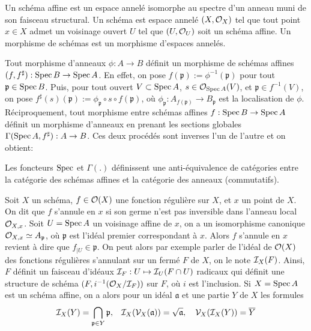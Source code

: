 \begin{defn}
Un schéma affine est un espace annelé isomorphe au spectre d'un anneau muni de son faisceau structural. Un schéma est espace annelé $(X,\mathcal{O}_X)$ tel que tout point $x\in X$ admet un voisinage ouvert $U$ tel que $(U,\mathcal{O}_U)$ soit un schéma affine. Un morphisme de schémas est un morphisme d'espaces annelés.
\end{defn}

Tout morphisme d'anneaux $\phi:A\rightarrow B$ définit un morphisme de schémas affines $(f,f^\sharp):\operatorname{Spec} B\rightarrow\operatorname{Spec} A$. En effet, on pose $f(\mathfrak{p}):=\phi^{-1}(\mathfrak{p})$ pour tout $\mathfrak{p}\in \operatorname{Spec} B$. Puis, pour tout ouvert $V\subset \operatorname{Spec} A$, $s\in\mathcal{O}_{\operatorname{Spec} A}(V)$, et $\mathfrak{p}\in f^{-1}(V)$, on pose $f^\sharp(s)(\mathfrak{p}):=\phi_{\mathfrak{p}}\circ s \circ f(\mathfrak{p})$, où $\phi_{\mathfrak{p}}:A_{f(\mathfrak{p})}\rightarrow B_{\mathfrak{p}}$ est la localisation de $\phi$.
Réciproquement, tout morphisme entre schémas affines $f:\operatorname{Spec} B\rightarrow \operatorname{Spec} A$ définit un morphisme d'anneaux en prenant les sections globales $\Gamma(\operatorname{Spec} A, f^\sharp):A\rightarrow B$. Ces deux procédés sont inverses l'un de l'autre et on obtient:


\begin{prop}\label{EqCat}
Les foncteurs $\operatorname{Spec}$ et $\Gamma(.)$ définissent une anti-équivalence de catégories entre la catégorie des schémas affines et la catégorie des anneaux (commutatifs).
\end{prop}

Soit $X$ un schéma, $f\in \mathcal{O}(X)$ une fonction régulière sur $X$, et $x$ un point de $X$. On dit que $f$ s'annule en $x$ si son germe n'est pas inversible dans l'anneau local $\mathcal{O}_{X,x}$. Soit $U=\operatorname{Spec} A$ un voisinage affine de $x$, on a un isomorphisme canonique $\mathcal{O}_{X,x}\simeq A_\mathfrak{p}$, où $\mathfrak{p}$ est l'idéal premier correspondant à $x$. Alors $f$ s'annule en $x$ revient à dire que $f_{|U}\in \mathfrak{p}$. On peut alors par exemple parler de l'idéal de $\mathcal{O}(X)$ des fonctions régulières s'annulant sur un fermé $F$ de $X$, on le note $\mathcal{I}_X(F)$. Ainsi, $F$ définit un faisceau d'idéaux $\mathcal{I}_F:U\mapsto \mathcal{I}_U(F\cap U)$ radicaux qui définit une structure de schéma $(F, i^{-1}(\mathcal{O}_X/\mathcal{I}_F))$ sur $F$, où $i$ est l'inclusion. Si $X=\operatorname{Spec} A$ est un schéma affine, on a alors pour un idéal $\mathfrak{a}$ et une partie $Y$ de $X$ les formules
$$\mathcal{I}_X(Y)=\bigcap_{\mathfrak{p}\in Y}\mathfrak{p},\,\,\,\,\, \mathcal{I}_X(\mathcal{V}_X(\mathfrak{a}))=\sqrt{\mathfrak{a}},\,\,\,\,\,\,\mathcal{V}_X(\mathcal{I}_X(Y))=\overline{Y}$$

